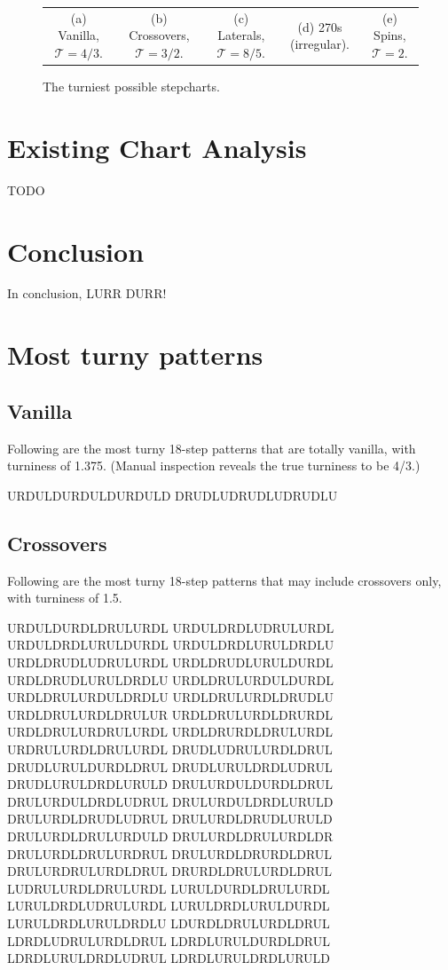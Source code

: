 \documentclass[10pt]{sigplanconf}
\begin{document}
\begin{figure}[t]
\begin{center}
\begin{tabular}{ccccc}
		\small (a) Vanilla, $\mathcal{T}=4/3$. &
		\small (b) Crossovers, $\mathcal{T}=3/2$. &
		\small (c) Laterals, $\mathcal{T}=8/5$. &
		\small (d) 270s (irregular). &
		\small (e) Spins, $\mathcal{T}=2$.
	\end{tabular}
	\end{center}
	\caption{The turniest possible stepcharts.}
	\label{fig:sequences}
\end{figure}

\section{Existing Chart Analysis}

TODO %

\section{Conclusion}

In conclusion, LURR DURR!




\appendix


\section{Most turny patterns}


\subsection{Vanilla}

Following are the most turny 18-step patterns that are totally vanilla, with turniness of 1.375. (Manual inspection reveals the true turniness to be 4/3.)

\noindent
URDULDURDULDURDULD
DRUDLUDRUDLUDRUDLU

\subsection{Crossovers}

Following are the most turny 18-step patterns that may include crossovers only, with turniness of 1.5.

\noindent
URDULDURDLDRULURDL
URDULDRDLUDRULURDL
URDULDRDLURULDURDL
URDULDRDLURULDRDLU
URDLDRUDLUDRULURDL
URDLDRUDLURULDURDL
URDLDRUDLURULDRDLU
URDLDRULURDULDURDL
URDLDRULURDULDRDLU
URDLDRULURDLDRUDLU
URDLDRULURDLDRULUR
URDLDRULURDLDRURDL
URDLDRULURDRULURDL
URDLDRURDLDRULURDL
URDRULURDLDRULURDL
DRUDLUDRULURDLDRUL
DRUDLURULDURDLDRUL
DRUDLURULDRDLUDRUL
DRUDLURULDRDLURULD
DRULURDULDURDLDRUL
DRULURDULDRDLUDRUL
DRULURDULDRDLURULD
DRULURDLDRUDLUDRUL
DRULURDLDRUDLURULD
DRULURDLDRULURDULD
DRULURDLDRULURDLDR
DRULURDLDRULURDRUL
DRULURDLDRURDLDRUL
DRULURDRULURDLDRUL
DRURDLDRULURDLDRUL
LUDRULURDLDRULURDL
LURULDURDLDRULURDL
LURULDRDLUDRULURDL
LURULDRDLURULDURDL
LURULDRDLURULDRDLU
LDURDLDRULURDLDRUL
LDRDLUDRULURDLDRUL
LDRDLURULDURDLDRUL
LDRDLURULDRDLUDRUL
LDRDLURULDRDLURULD
\end{document}
